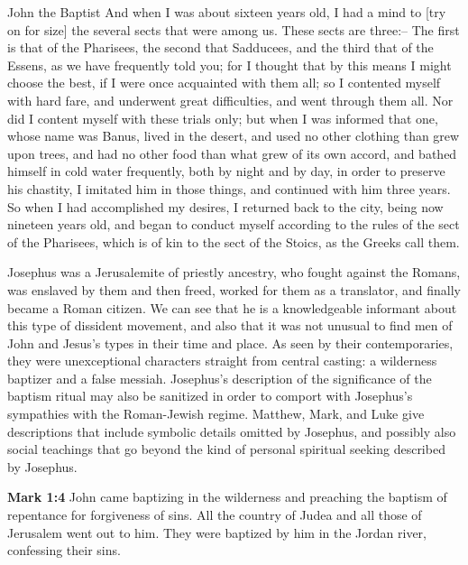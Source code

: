 \documentclass[10pt,twoside]{article} %
\newcommand{\quotesize}{\normalsize{}}
\newcommand{\comm}[1]{\begingroup \color{black!50} #1\endgroup}
\newenvironment{quotetext}{\begingroup\quotesize}{\endgroup}
\newcommand{\intex}[1]{\index[texts]{#1}}
\newcommand{\bible}[2]{\begin{quotetext}\textbf{#1}\intex{#1} #2\end{quotetext}}
\newcommand{\gospelmark}[2]{\bible{Mark #1}{#2}}
\begin{document}
\begin{section}{John the Baptist}
\begin{quotetext}
And when I was
about sixteen years old, I had a mind to [try on for size] the several sects
that were among us. These sects are three:-- The first is that of the
Pharisees, the second that Sadducees, and the third that of the Essens,
as we have frequently told you; for I thought that by this means I might
choose the best, if I were once acquainted with them all; so I contented
myself with hard fare, and underwent great difficulties, and went
through them all. Nor did I content myself with these trials only; but
when I was informed that one, whose name was Banus, lived in the desert,
and used no other clothing than grew upon trees, and had no other food
than what grew of its own accord, and bathed himself in cold water
frequently, both by night and by day, in order to preserve his chastity,
I imitated him in those things, and continued with him three years.
So when I had accomplished my desires, I returned back to the city,
being now nineteen years old, and began to conduct myself according to
the rules of the sect of the Pharisees, which is of kin to the sect of
the Stoics, as the Greeks call them.
\end{quotetext}


\comm{
Josephus was a Jerusalemite of priestly ancestry, who fought against the Romans,
was enslaved by them and then freed, worked for them as a translator, and finally became a Roman citizen.
We can see that he is a knowledgeable informant about this type of dissident movement, and also that it
was not unusual to find men of John and Jesus's types in their time and place. As seen by their contemporaries,
they were unexceptional characters straight from central casting: a wilderness baptizer and a false messiah.
Josephus's description of the significance of the baptism ritual may also be
sanitized in order to comport with Josephus's sympathies
with the Roman-Jewish regime. Matthew, Mark, and Luke give descriptions that include symbolic details omitted by Josephus,
and possibly also social teachings that go beyond the kind of personal spiritual seeking described by Josephus.
}

\gospelmark{1:4}{John came baptizing in the wilderness and preaching the
baptism of repentance for forgiveness of sins.  All the country of
Judea and all those of Jerusalem went out to him. They were baptized
by him in the Jordan river, confessing their sins.}


\end{section}
\end{document}
